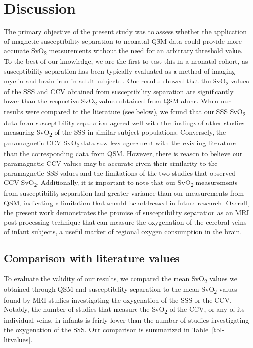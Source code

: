 \documentclass[
true
]{sn-jnl}
\begin{document}
\section{Discussion}\label{sec-discussion}

The primary objective of the present study was to assess whether the
application of magnetic susceptibility separation to neonatal QSM data
could provide more accurate SvO\textsubscript{2} measurements without
the need for an arbitrary threshold value. To the best of our knowledge,
we are the first to test this in a neonatal cohort, as susceptibility
separation has been typically evaluated as a method of imaging myelin
and brain iron in adult subjects
\citep{shinHseparationMagneticSusceptibility2021, ahmedDiamagneticComponentMap2023a}.
Our results showed that the SvO\textsubscript{2} values of the SSS and
CCV obtained from susceptibility separation are significantly lower than
the respective SvO\textsubscript{2} values obtained from QSM alone. When
our results were compared to the literature (see below), we found that
our SSS SvO\textsubscript{2} data from susceptibility separation agreed
well with the findings of other studies measuring SvO\textsubscript{2}
of the SSS in similar subject populations. Conversely, the paramagnetic
CCV SvO\textsubscript{2} data saw less agreement with the existing
literature than the corresponding data from QSM. However, there is
reason to believe our paramagnetic CCV values may be accurate given
their similarity to the paramagnetic SSS values and the limitations of
the two studies that observed CCV SvO\textsubscript{2}. Additionally, it
is important to note that our SvO\textsubscript{2} measurements from
susceptibility separation had greater variance than our measurements
from QSM, indicating a limitation that should be addressed in future
research. Overall, the present work demonstrates the promise of
susceptibility separation as an MRI post-processing technique that can
measure the oxygenation of the cerebral veins of infant subjects, a
useful marker of regional oxygen consumption in the brain.

\subsection{Comparison with literature
values}\label{comparison-with-literature-values}

To evaluate the validity of our results, we compared the mean
SvO\textsubscript{2} values we obtained through QSM and susceptibility
separation to the mean SvO\textsubscript{2} values found by MRI studies
investigating the oxygenation of the SSS or the CCV. Notably, the number
of studies that measure the SvO\textsubscript{2} of the CCV, or any of
its individual veins, in infants is fairly lower than the number of
studies investigating the oxygenation of the SSS. Our comparison is
summarized in Table~\ref{tbl-litvalues}.
\end{document}
